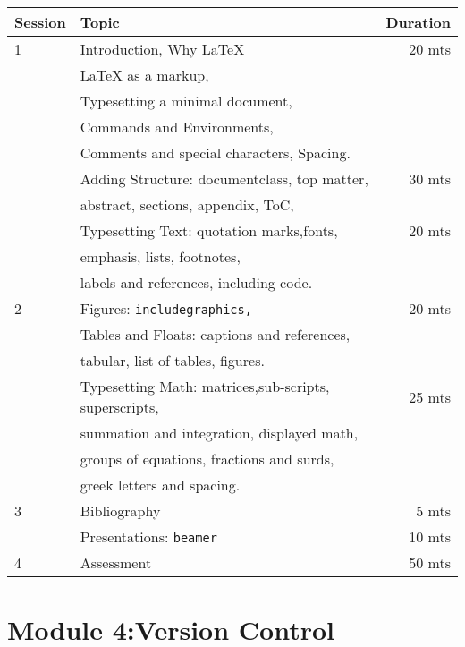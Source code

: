 \documentclass{article}
\begin{document}
\begin{tabular}{llr}
\hline
Session & Topic & Duration\\\hline
1 & Introduction, Why LaTeX                                   & 20 mts\\ 
  & LaTeX as a markup,                                        & \\ 
  & Typesetting a minimal document,                           & \\
  & Commands and Environments,                                & \\
  & Comments and special characters, Spacing.                 & \\
  & Adding Structure: documentclass, top matter,              & 30 mts\\
  & abstract, sections, appendix, ToC,                        & \\
  & Typesetting Text: quotation marks,fonts,                  & 20 mts\\
  & emphasis, lists, footnotes,                               & \\
  & labels and references, including code.                    & \\\hline

2 & Figures: \tt{includegraphics},                            & 20 mts\\
  & Tables and Floats: captions and references,               & \\
  & tabular, list of tables, figures.                         & \\
  & Typesetting Math: matrices,sub-scripts, superscripts,     & 25 mts\\
  & summation and integration, displayed math,                & \\
  & groups of equations, fractions and surds,                 & \\
  & greek letters and spacing.                                & \\\hline

3 & Bibliography                                              & ~5 mts\\
  & Presentations: \tt{beamer}                                & 10 mts\\\hline

4 & Assessment                                                & 50 mts\\\hline\hline
\end{tabular}

\section{Module 4:Version Control}
\label{VC}
\end{document}
